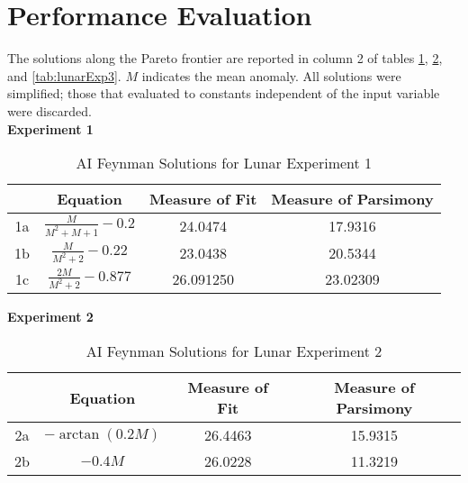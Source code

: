 \documentclass[fleqn,10pt]{olplainarticle}
\numberwithin{equation}{subsection}
\begin{document}


\section{Performance Evaluation}

The solutions along the Pareto frontier are reported in column 2 of tables \ref{tab:lunarExp1}, \ref{tab:lunarExp2}, and \ref{tab:lunarExp3}. $M$ indicates the mean anomaly. All solutions were simplified; those that evaluated to constants independent of the input variable were discarded.\\

\textbf{Experiment 1}
\renewcommand{\arraystretch}{3}
\begin{table}[H]
    \centering
    \begin{tabular}{|c|c|c|c|}\hline
         &\textbf{Equation} & \textbf{Measure of Fit} & \textbf{Measure of Parsimony} \\\hline
         1a & $\frac{M}{M^2+M+1}-0.2$ & 24.0474 & 17.9316 \\\hline
         1b & $\frac{M}{M^2+2}-0.22$ & 23.0438 & 20.5344 \\\hline
         1c & $\frac{2M}{M^2+2}-0.877$ & 26.091250 & 23.02309 \\\hline
    \end{tabular}
    \caption{AI Feynman Solutions for Lunar Experiment 1}
    \label{tab:lunarExp1}
\end{table}

\textbf{Experiment 2}
\renewcommand{\arraystretch}{3}
\begin{table}[H]
    \centering
    \begin{tabular}{|c|c|c|c|}\hline
         &\textbf{Equation} & \textbf{Measure of Fit} & \textbf{Measure of Parsimony} \\\hline
         2a & $-\arctan(0.2M)$ & 26.4463 & 15.9315 \\\hline
         2b & $-0.4M$ & 26.0228 & 11.3219 \\\hline
    \end{tabular}
    \caption{AI Feynman Solutions for Lunar Experiment 2}
    \label{tab:lunarExp2}
\end{table}
\end{document}
